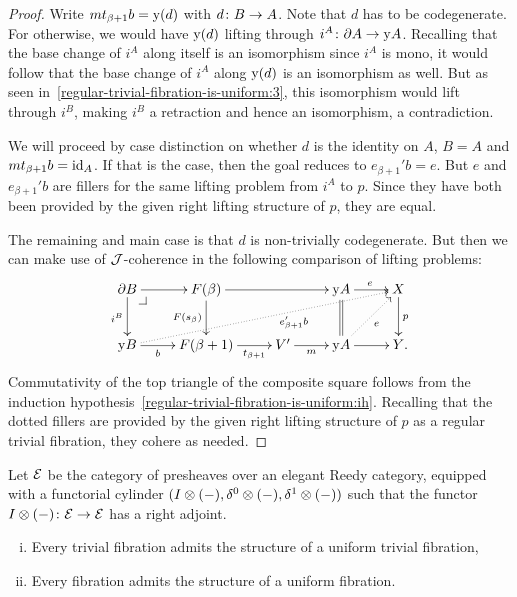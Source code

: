 \documentclass[reqno,10pt,a4paper,oneside,draft]{amsart}
\begin{document}
\begin{proof}
Write $m t_{\beta+1} b = \yon(d)$ with $d \co B \to A$.
Note that $d$ has to be codegenerate.
For otherwise, we would have $\yon(d)$ lifting through $i^A \co \partial A \to \yon A$.
Recalling that the base change of $i^A$ along itself is an isomorphism since $i^A$ is mono, it would follow that the base change of $i^A$ along $\yon(d)$ is an isomorphism as well.
But as seen in~\eqref{regular-trivial-fibration-is-uniform:3}, this isomorphism would lift through $i^B$, making $i^B$ a retraction and hence an isomorphism, a contradiction.

We will proceed by case distinction on whether $d$ is the identity on $A$, \ie $B = A$ and $m t_{\beta+1} b = \id_A$.
If that is the case, then the goal reduces to $e_{\beta+1}' b = e$.
But $e$ and $e_{\beta+1}' b$ are fillers for the same lifting problem from $i^A$ to $p$.
Since they have both been provided by the given right lifting structure of $p$, they are equal.

The remaining and main case is that $d$ is non-trivially codegenerate.
But then we can make use of $\cal{J}$-coherence in the following comparison of lifting problems:
\[
\xymatrix{
  \partial B
  \ar[r]
  \ar[d]_{i^B}
  \pullback{dr}
&
  F(\beta)
  \ar[rr]
  \ar[d]_{F(s_{\beta})}
&&
  \yon A
  \ar[r]^{e}
  \ar@{=}[d]
&
  X
  \ar[d]^{p}
\\
  \yon B
  \ar[r]_-{b}
  \ar@{.>}[urrrr]_(0.6){e_{\beta+1}' b}
&
  F(\beta+1)
  \ar[r]_-{t_{\beta+1}}
&
  V'
  \ar[r]_-{m}
&
  \yon A
  \ar[r]
  \ar@{.>}[ur]_{e}
&
  Y
\rlap{.}}
\]
Commutativity of the top triangle of the composite square follows from the induction hypothesis~\eqref{regular-trivial-fibration-is-uniform:ih}.
Recalling that the dotted fillers are provided by the given right lifting structure of $p$ as a regular trivial fibration, they cohere as needed.
\end{proof}

\begin{theorem} \label{thm:ac-kan-is-uniform} Let $\catE$ be the category of presheaves over an elegant Reedy category, equipped with a functorial cylinder $(\interval \otimes (-), \lcyl \otimes (-), \rcyl \otimes(-))$ such that the functor $\interval \otimes (-) \co \catE \to \catE$ has a right adjoint.
\begin{enumerate}[(i)]
\item Every trivial fibration admits the structure of a uniform trivial fibration,
\item Every fibration admits the structure of a uniform fibration.
\end{enumerate}
\end{theorem}
\end{document}
